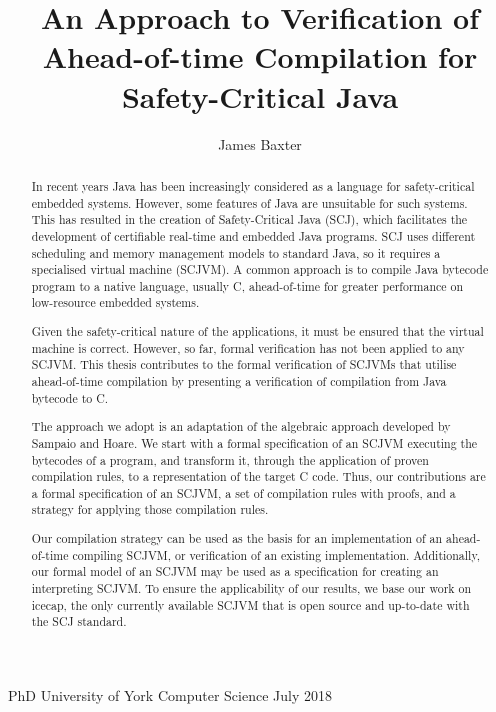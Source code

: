 \documentclass[a4paper,11pt,twoside,openright]{report}
\title{An Approach to Verification of Ahead-of-time Compilation for Safety-Critical Java}
\author{James Baxter}
\date{}
\begin{document}
\begin{titlepage}
  \centering{}
  \hfill
  \vfill
  \vfill
  \vfill
  {\Huge\bf \thetitle}
  \vfill
  \vfill
  {\huge \theauthor}
  \vfill
  \vfill
  {\LARGE PhD}
  \vfill
  {\LARGE University of York}
  \vfill
  {\LARGE Computer Science}
  \vfill
  {\LARGE July 2018}
\end{titlepage}

\null
\thispagestyle{empty}%
\addtocounter{page}{-1}%
\newpage

\clearpage
{}
{}
\begin{abstract}
  \thispagestyle{plain}
  In recent years Java has been increasingly considered as a language
  for safety-critical embedded systems.
  However, some features of Java are unsuitable for such systems.
  This has resulted in the creation of Safety-Critical Java (SCJ),
  which facilitates the development of certifiable real-time and
  embedded Java programs.
  SCJ uses different scheduling and memory management models to
  standard Java, so it requires a specialised virtual machine (SCJVM).
  A common approach is to compile Java bytecode program to a native
  language, usually C, ahead-of-time for greater performance on
  low-resource embedded systems.
  
  Given the safety-critical nature of the applications, it must be
  ensured that the virtual machine is correct.
  However, so far, formal verification has not been applied to any
  SCJVM.
  This thesis contributes to the formal verification of SCJVMs that
  utilise ahead-of-time compilation by presenting a verification of
  compilation from Java bytecode to C.
  
  The approach we adopt is an adaptation of the algebraic approach
  developed by Sampaio and Hoare.
  We start with a formal specification of an SCJVM executing the
  bytecodes of a program, and transform it, through the application
  of proven compilation rules, to a representation of the target C
  code.
  Thus, our contributions are a formal specification of an SCJVM, a
  set of compilation rules with proofs, and a strategy for applying
  those compilation rules.
  
  Our compilation strategy can be used as the basis for an
  implementation of an ahead-of-time compiling SCJVM, or verification
  of an existing implementation.
  Additionally, our formal model of an SCJVM may be used as a
  specification for creating an interpreting SCJVM.
  To ensure the applicability of our results, we base our work on
  icecap, the only currently available SCJVM that is open source and
  up-to-date with the SCJ standard.
\end{abstract}
\end{document}
